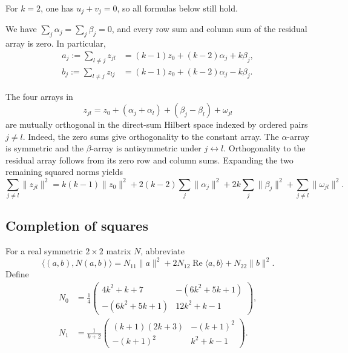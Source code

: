 \documentclass[11pt]{article}
\newcommand{\Rea}{\operatorname{Re}}
\newcommand{\ip}[2]{\langle #1,#2\rangle}
\newcommand{\nrm}[1]{\lVert #1\rVert}
\begin{document}
For \(k=2\), one has \(u_j+v_j=0\), so all formulas below still hold.

We have \(\sum_j\alpha_j=\sum_j\beta_j=0\), and every row sum and
column sum of the residual array is zero. In particular,
\begin{align}
 a_j:=\sum_{l\ne j}z_{jl}
  &=(k-1)z_0+(k-2)\alpha_j+k\beta_j, \label{eq:rows}\\
 b_j:=\sum_{l\ne j}z_{lj}
  &=(k-1)z_0+(k-2)\alpha_j-k\beta_j. \label{eq:columns}
\end{align}

The four arrays in
\[
 z_{jl}=z_0+(\alpha_j+\alpha_l)+(\beta_j-\beta_l)+\omega_{jl}
\]
are mutually orthogonal in the direct-sum Hilbert space indexed by
ordered pairs \(j\ne l\).
Indeed, the zero sums give orthogonality to the constant array.
The \(\alpha\)-array is symmetric and the \(\beta\)-array is
antisymmetric under \(j\leftrightarrow l\).
Orthogonality to the residual array follows from its zero row and
column sums. Expanding the two remaining squared norms yields
\begin{equation}\label{eq:pair-norm}
 \sum_{j\ne l}\nrm{z_{jl}}^2
 =k(k-1)\nrm{z_0}^2
 +2(k-2)\sum_j\nrm{\alpha_j}^2
 +2k\sum_j\nrm{\beta_j}^2
 +\sum_{j\ne l}\nrm{\omega_{jl}}^2.
\end{equation}

\subsection{Completion of squares}

For a real symmetric \(2\times2\) matrix \(N\), abbreviate
\[
 \ip{(a,b)}{N(a,b)}
 =N_{11}\nrm a^2+2N_{12}\Rea\ip a b+N_{22}\nrm b^2.
\]
Define
\begin{align}
 N_0&=\frac14
 \begin{pmatrix}
 4k^2+k+7&-(6k^2+5k+1)\\
 -(6k^2+5k+1)&12k^2+k-1
 \end{pmatrix},\label{eq:N0}\\
 N_1&=\frac1{k+2}
 \begin{pmatrix}
 (k+1)(2k+3)&-(k+1)^2\\
 -(k+1)^2&k^2+k-1
 \end{pmatrix}.\label{eq:N1}
\end{align}
\end{document}
